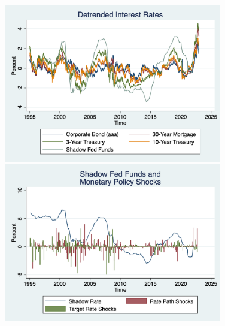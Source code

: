 \documentclass[12pt,final]{article}
\begin{document}
	\includegraphics[width=3.75in]{detrend.png} \includegraphics[width=3.75in]{shocks_time.png} \\
\end{document}
